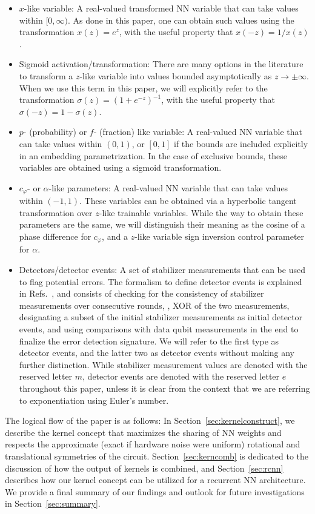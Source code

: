\begin{itemize}
\item $x$-like variable: A real-valued transformed NN variable that can take values within $[0, \infty)$. As done in this paper, one can obtain such values using the transformation $x(z)=e^z$, with the useful property that $x(-z)=1/x(z)$.
\item Sigmoid activation/transformation: There are many options in the literature to transform a $z$-like variable into values bounded asymptotically as $z \to \pm \infty$. When we use this term in this paper, we will explicitly refer to the transformation $\sigma(z)=\left(1+e^{-z}\right)^{-1}$, with the useful property that $\sigma(-z)=1-\sigma(z)$.
\item $p$- (probability) or $f$- (fraction) like variable: A real-valued NN variable that can take values within $(0, 1)$, or $[0,1]$ if the bounds are included explicitly in an embedding parametrization. In the case of exclusive bounds, these variables are obtained using a sigmoid transformation.
\item $c_\varphi$- or $\alpha$-like parameters: A real-valued NN variable that can take values within $(-1, 1)$. These variables can be obtained via a hyperbolic tangent transformation over $z$-like trainable variables. While the way to obtain these parameters are the same, we will distinguish their meaning as the cosine of a phase difference for $c_\varphi$, and a $z$-like variable sign inversion control parameter for $\alpha$.
\item Detectors/detector events: A set of stabilizer measurements that can be used to flag potential errors. The formalism to define detector events is explained in Refs.~\cite{Gidney:2021,Higgott:2023,Bausch:2023jgi}, and consists of checking for the consistency of stabilizer measurements over consecutive rounds, \ie, XOR of the two measurements, designating a subset of the initial stabilizer measurements as initial detector events, and using comparisons with data qubit measurements in the end to finalize the error detection signature. We will refer to the first type as  detector events, and the latter two as  detector events without making any further distinction. While stabilizer measurement values are denoted with the reserved letter $m$, detector events are denoted with the reserved letter $e$ throughout this paper, unless it is clear from the context that we are referring to exponentiation using Euler's number.
\end{itemize}

The logical flow of the paper is as follows: In Section~\ref{sec:kernelconstruct}, we describe the kernel concept that maximizes the sharing of NN weights and respects the approximate (exact if hardware noise were uniform) rotational and translational symmetries of the circuit. Section~\ref{sec:kerncomb} is dedicated to the discussion of how the output of kernels is combined, and Section~\ref{sec:rcnn} describes how our kernel concept can be utilized for a recurrent NN architecture. We provide a final summary of our findings and outlook for future investigations in Section~\ref{sec:summary}.

